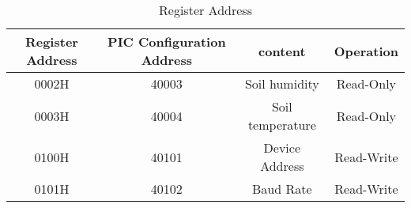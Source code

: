 \documentclass[11pt]{article}
\begin{document}
\begin{table}
    \centering
    \caption{Register Address}
    \label{t2}
    \resizebox{\textwidth}{!}
    {
    \begin{tabular}{|c|c|c|c|}
    \noalign{\smallskip}\noalign{\smallskip}\hline
    Register Address & PIC Configuration Address & content & Operation \\
    \hline
    0002H & 40003 & Soil humidity & Read-Only \\
    \hline
    0003H & 40004 & Soil temperature & Read-Only \\
    \hline
    0100H & 40101 & Device Address & Read-Write \\
    \hline
    0101H & 40102 & Baud Rate & Read-Write \\
    \hline    
    \end{tabular}
    }
\end{table}

\end{document}
